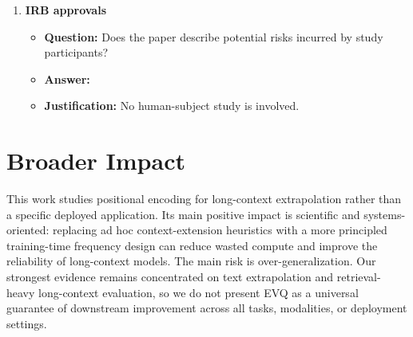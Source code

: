 \documentclass{article}
\begin{document}
\begin{enumerate}
\item \textbf{IRB approvals}
\begin{itemize}
\item \textbf{Question:} Does the paper describe potential risks incurred by study participants?
\item \textbf{Answer:} \answerNA{}
\item \textbf{Justification:} No human-subject study is involved.
\end{itemize}
\end{enumerate}

\clearpage
\appendix

\section*{Broader Impact}

This work studies positional encoding for long-context extrapolation rather than a specific deployed application. Its main positive impact is scientific and systems-oriented: replacing ad hoc context-extension heuristics with a more principled training-time frequency design can reduce wasted compute and improve the reliability of long-context models. The main risk is over-generalization. Our strongest evidence remains concentrated on text extrapolation and retrieval-heavy long-context evaluation, so we do not present EVQ as a universal guarantee of downstream improvement across all tasks, modalities, or deployment settings.




\end{document}
